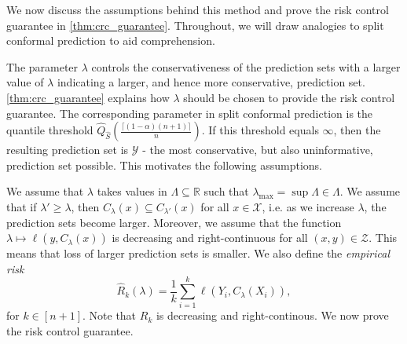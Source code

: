 \documentclass[11pt, titlepage]{article} %
\newcommand{\R}{\mathrm}
\numberwithin{equation}{section}
\theoremstyle{definition}
\numberwithin{theorem}{section}
\numberwithin{lemma}{section}
\numberwithin{corollary}{section}
\numberwithin{proposition}{section}
\numberwithin{definition}{section}
\numberwithin{remark}{section}
\begin{document}
\noindent
We now discuss the assumptions behind this method and prove the risk control guarantee in \cref{thm:crc_guarantee}. Throughout, we will draw analogies to split conformal prediction to aid comprehension. \vskip5pt

\noindent
The parameter \(\lambda\) controls the conservativeness of the prediction sets with a larger value of \(\lambda\) indicating a larger, and hence more conservative, prediction set. \cref{thm:crc_guarantee} explains how \(\lambda\) should be chosen to provide the risk control guarantee. The corresponding parameter in split conformal prediction is the quantile threshold \(\hat{Q}_{\hat{S}}\left( \frac{\lceil (1-\alpha)(n+1) \rceil}{n} \right)\). If this threshold equals \(\infty\), then the resulting prediction set is \(\mathcal{Y}\) - the most conservative, but also uninformative, prediction set possible. This motivates the following assumptions. \vskip5pt

\noindent
We assume that \(\lambda\) takes values in \(\Lambda \subseteq \mathbb{R}\) such that \( \lambda_{\R{max}} = \sup \Lambda \in \Lambda\). We assume that if \(\lambda' \geq \lambda\), then \(C_\lambda (x) \subseteq C_{\lambda'}(x)\) for all \(x \in \mathcal{X}\), i.e. as we increase \(\lambda\), the prediction sets become larger. Moreover, we assume that the function \(\lambda \mapsto \ell(y, C_\lambda(x))\) is decreasing and right-continuous for all \((x,y) \in \mathcal{Z}\). This means that loss of larger prediction sets is smaller. We also define the \textit{empirical risk} \[\hat{R}_k(\lambda) = \frac{1}{k} \sum_{i=1}^k \ell(Y_i, C_\lambda (X_i)),\] for \(k \in [n+1]\). Note that \(R_k\) is decreasing and right-continous. We now prove the risk control guarantee.
\end{document}
